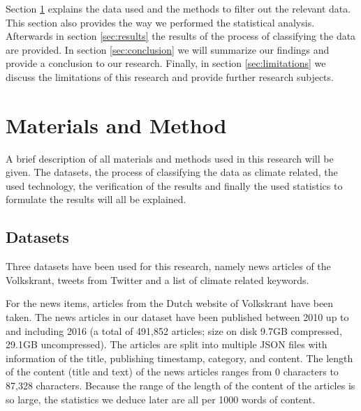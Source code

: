 \documentclass[paper=a4, fontsize=9px]{scrartcl} %
\numberwithin{equation}{section} %
\numberwithin{figure}{section} %
\numberwithin{table}{section} %
\begin{document}
\begin{multicols}{2}
Section \ref{sec:method} explains the data used and the methods to filter out the relevant data. This section also provides the way we performed the statistical analysis.
Afterwards in section \ref{sec:results} the results of the process of classifying the data are provided. In section \ref{sec:conclusion} we will summarize our findings and provide a conclusion to our research. Finally, in section \ref{sec:limitations} we discuss the limitations of this research and provide further research subjects.


\section{Materials and Method}\label{sec:method}

A brief description of all materials and methods used in this research will be given. The datasets, the process of classifying the data as climate related, the used technology, the verification of the results and finally the used statistics to formulate the results will all be explained.


\subsection{Datasets}

Three datasets have been used for this research, namely news articles of the Volkskrant, tweets from Twitter and a list of climate related keywords.

For the news items, articles from the Dutch website of Volkskrant have been taken. The news articles in our dataset have been published between 2010 up to and including 2016 (a total of 491,852 articles; size on disk 9.7GB compressed, 29.1GB uncompressed). The articles are split into multiple JSON files with information of the title, publishing timestamp, category, and content. The length of the content (title and text) of the news articles ranges from 0 characters to 87,328 characters. Because the range of the length of the content of the articles is so large, the statistics we deduce later are all per 1000 words of content. 



\end{multicols}
\end{document}
